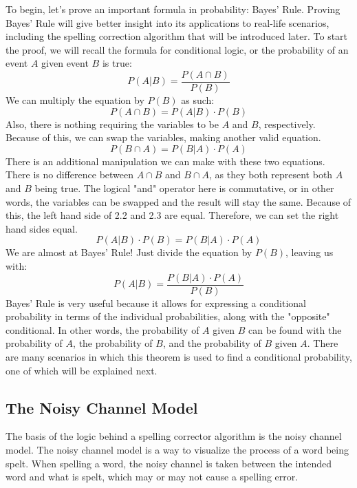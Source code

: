 \documentclass[12pt]{article}
\numberwithin{equation}{section}
\begin{document}
To begin, let's prove an important formula in probability: Bayes' Rule. Proving Bayes' Rule will give better insight into its applications to real-life scenarios, including the spelling correction algorithm that will be introduced later. To start the proof, we will recall the formula for conditional logic, or the probability of an event $A$ given event $B$ is true:
\begin{equation} P(A|B)=\frac{P(A\cap{B})}{P(B)} \end{equation}
We can multiply the equation by $P(B)$ as such:
\begin{equation} P(A\cap{B})=P(A|B)\cdot{P(B)} \end{equation}
Also, there is nothing requiring the variables to be $A$ and $B$, respectively. Because of this, we can swap the variables, making another valid equation.
\begin{equation} P(B\cap{A})=P(B|A)\cdot{P(A)} \end{equation}
There is an additional manipulation we can make with these two equations. There is no difference between $A\cap{}B$ and $B\cap{A}$, as they both represent both $A$ and $B$ being true. The logical "and" operator here is commutative, or in other words, the variables can be swapped and the result will stay the same. Because of this, the left hand side of 2.2 and 2.3 are equal. Therefore, we can set the right hand sides equal.
\begin{equation} P(A|B)\cdot{P(B)}=P(B|A)\cdot{P(A)} \end{equation}
We are almost at Bayes' Rule! Just divide the equation by $P(B)$, leaving us with:
\begin{equation} P(A|B)=\frac{P(B|A)\cdot{P(A)}}{P(B)} \end{equation}
Bayes' Rule is very useful because it allows for expressing a conditional probability in terms of the individual probabilities, along with the "opposite" conditional. In other words, the probability of $A$ given $B$ can be found with the probability of $A$, the probability of $B$, and the probability of $B$ given $A$. There are many scenarios in which this theorem is used to find a conditional probability, one of which will be explained next.

\subsection{The Noisy Channel Model}

The basis of the logic behind a spelling corrector algorithm is the noisy channel model. The noisy channel model is a way to visualize the process of a word being spelt. When spelling a word, the noisy channel is taken between the intended word and what is spelt, which may or may not cause a spelling error.
\end{document}
